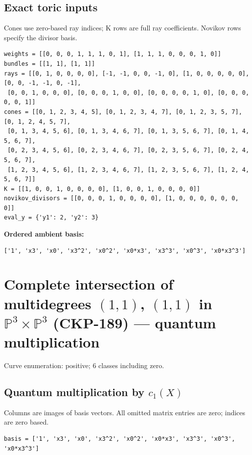 \documentclass[10pt,a4paper]{article}
\begin{document}
\subsection*{Exact toric inputs}
Cones use zero-based ray indices; K rows are full ray coefficients. Novikov rows specify the divisor basis.

\begin{lstlisting}
weights = [[0, 0, 0, 1, 1, 1, 0, 1], [1, 1, 1, 0, 0, 0, 1, 0]]
bundles = [[1, 1], [1, 1]]
rays = [[0, 1, 0, 0, 0, 0], [-1, -1, 0, 0, -1, 0], [1, 0, 0, 0, 0, 0], [0, 0, -1, -1, 0, -1],
 [0, 0, 1, 0, 0, 0], [0, 0, 0, 1, 0, 0], [0, 0, 0, 0, 1, 0], [0, 0, 0, 0, 0, 1]]
cones = [[0, 1, 2, 3, 4, 5], [0, 1, 2, 3, 4, 7], [0, 1, 2, 3, 5, 7], [0, 1, 2, 4, 5, 7],
 [0, 1, 3, 4, 5, 6], [0, 1, 3, 4, 6, 7], [0, 1, 3, 5, 6, 7], [0, 1, 4, 5, 6, 7],
 [0, 2, 3, 4, 5, 6], [0, 2, 3, 4, 6, 7], [0, 2, 3, 5, 6, 7], [0, 2, 4, 5, 6, 7],
 [1, 2, 3, 4, 5, 6], [1, 2, 3, 4, 6, 7], [1, 2, 3, 5, 6, 7], [1, 2, 4, 5, 6, 7]]
K = [[1, 0, 0, 1, 0, 0, 0, 0], [1, 0, 0, 1, 0, 0, 0, 0]]
novikov_divisors = [[0, 0, 0, 1, 0, 0, 0, 0], [1, 0, 0, 0, 0, 0, 0, 0]]
eval_y = {'y1': 2, 'y2': 3}
\end{lstlisting}

\textbf{Ordered ambient basis:}
\begin{lstlisting}
['1', 'x3', 'x0', 'x3^2', 'x0^2', 'x0*x3', 'x3^3', 'x0^3', 'x0*x3^3']
\end{lstlisting}

\clearpage\section*{Complete intersection of multidegrees $(1,1)$, $(1,1)$ in $\mathbb P^{3}\times \mathbb P^{3}$ (CKP-189) --- quantum multiplication}

Curve enumeration: positive; 6 classes including zero.
\subsection*{Quantum multiplication by $c_1(X)$}
Columns are images of basis vectors. All omitted matrix entries are zero; indices are zero based.

\begin{lstlisting}
basis = ['1', 'x3', 'x0', 'x3^2', 'x0^2', 'x0*x3', 'x3^3', 'x0^3', 'x0*x3^3']
\end{lstlisting}
\end{document}
